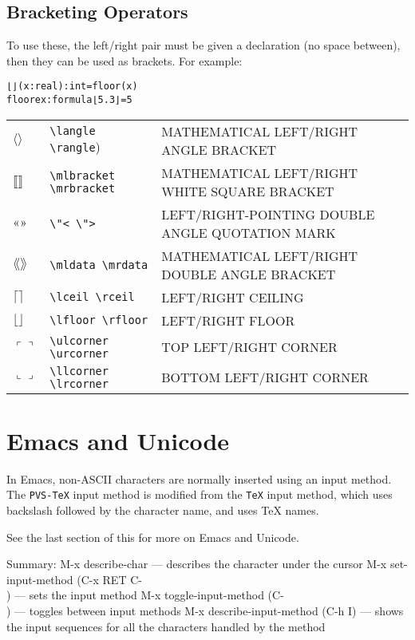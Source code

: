 \subsection{Bracketing Operators}

To use these, the left/right pair must be given a declaration (no space
between), then they can be used as brackets.  For example:
\begin{alltt}
  ⌊⌋(x: real): int = floor(x)
  floorex: formula ⌊5.3⌋ = 5
\end{alltt}

\begin{center}
\smaller
{} \label{unicode:brackets}
\begin{xtabular}{|ll>{\smaller\ttfamily}l|}\hline
$⟨ ⟩$ & \verb|\langle \rangle|) & MATHEMATICAL LEFT/RIGHT ANGLE BRACKET \\
$⟦ ⟧$ & \verb|\mlbracket \mrbracket| & MATHEMATICAL LEFT/RIGHT WHITE SQUARE BRACKET \\
$« »$ & \verb|\"< \">| & LEFT/RIGHT-POINTING DOUBLE ANGLE QUOTATION MARK\\
$⟪ ⟫$ & \verb|\mldata \mrdata| & MATHEMATICAL LEFT/RIGHT DOUBLE ANGLE BRACKET \\
$⌈ ⌉$ & \verb|\lceil \rceil| & LEFT/RIGHT CEILING \\
$⌊ ⌋$ & \verb|\lfloor \rfloor| & LEFT/RIGHT FLOOR \\
$⌜ ⌝$ & \verb|\ulcorner \urcorner| & TOP LEFT/RIGHT CORNER \\
$⌞ ⌟$ & \verb|\llcorner \lrcorner| & BOTTOM LEFT/RIGHT CORNER \\
\end{xtabular}
\end{center}

\section{Emacs and Unicode}

In Emacs, non-ASCII characters are normally inserted using an input
method.  The \texttt{PVS-TeX} input method is modified from the
\texttt{TeX} input method, which uses backslash followed by the character
name, and uses TeX names.

See the last section of this for more on Emacs and Unicode.

Summary:
  M-x describe-char — describes the character under the cursor
  M-x set-input-method (C-x RET C-\\) — sets the input method
  M-x toggle-input-method (C-\\) — toggles between input methods
  M-x describe-input-method (C-h I) — shows the input sequences
         for all the characters handled by the method

